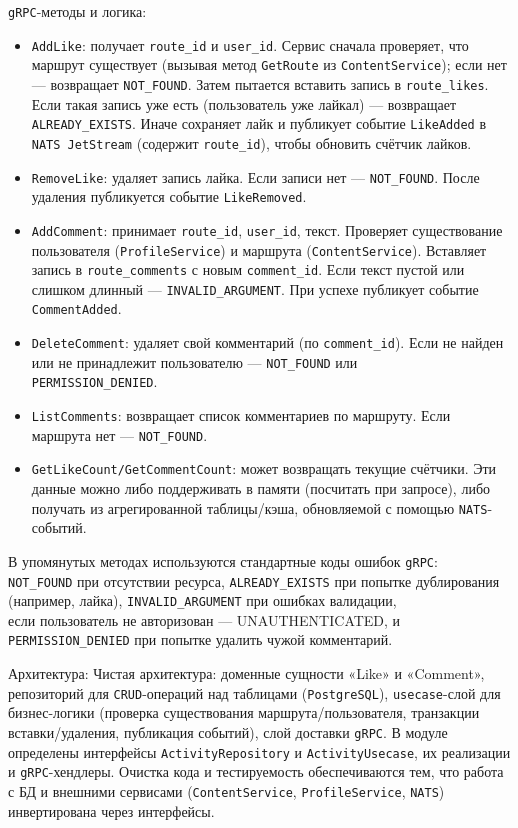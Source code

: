 \texttt{gRPC}-методы и логика:
\begin{itemize}
    \item \texttt{AddLike}: получает \texttt{route\_id} и \texttt{user\_id}. Сервис сначала проверяет, что маршрут существует (вызывая метод \texttt{GetRoute} из \texttt{ContentService}); если нет — возвращает \texttt{NOT\_FOUND}. Затем пытается вставить запись в \texttt{route\_likes}. Если такая запись уже есть (пользователь уже лайкал) — возвращает \texttt{ALREADY\_EXISTS}. Иначе сохраняет лайк и публикует событие \texttt{LikeAdded} в \texttt{NATS JetStream} (содержит \texttt{route\_id}), чтобы обновить счётчик лайков.
    \item \texttt{RemoveLike}: удаляет запись лайка. Если записи нет — \texttt{NOT\_FOUND}. После удаления публикуется событие \texttt{LikeRemoved}.
    \item \texttt{AddComment}: принимает \texttt{route\_id}, \texttt{user\_id}, текст. Проверяет существование пользователя (\texttt{ProfileService}) и маршрута (\texttt{ContentService}). Вставляет запись в \texttt{route\_comments} с новым \texttt{comment\_id}. Если текст пустой или слишком длинный — \texttt{INVALID\_ARGUMENT}. При успехе публикует событие \texttt{CommentAdded}.
    \item \texttt{DeleteComment}: удаляет свой комментарий (по \texttt{comment\_id}). Если не найден или не принадлежит пользователю — \texttt{NOT\_FOUND} или \\ \texttt{PERMISSION\_DENIED}.
    \item \texttt{ListComments}: возвращает список комментариев по маршруту. Если маршрута нет — \texttt{NOT\_FOUND}.
    \item \texttt{GetLikeCount/GetCommentCount}: может возвращать текущие счётчики. Эти данные можно либо поддерживать в памяти (посчитать при запросе), либо получать из агрегированной таблицы/кэша, обновляемой с помощью \texttt{NATS}-событий.
\end{itemize}
В упомянутых методах используются стандартные коды ошибок \texttt{gRPC}: \\ \texttt{NOT\_FOUND} при отсутствии ресурса, \texttt{ALREADY\_EXISTS} при попытке дублирования (например, лайка), \texttt{INVALID\_ARGUMENT} при ошибках валидации, \\ если пользователь не авторизован — UNAUTHENTICATED,  и \texttt{PERMISSION\_DENIED} при попытке удалить чужой комментарий.

Архитектура: Чистая архитектура: доменные сущности «Like» и «Comment», репозиторий для \texttt{CRUD}-операций над таблицами (\texttt{PostgreSQL}), \texttt{usecase}-слой для бизнес-логики (проверка существования маршрута/пользователя, транзакции вставки/удаления, публикация событий), слой доставки \texttt{gRPC}. В модуле определены интерфейсы \texttt{ActivityRepository} и \texttt{ActivityUsecase}, их реализации и \texttt{gRPC}-хендлеры. Очистка кода и тестируемость обеспечиваются тем, что работа с БД и внешними сервисами (\texttt{ContentService}, \texttt{ProfileService}, \texttt{NATS}) инвертирована через интерфейсы.

